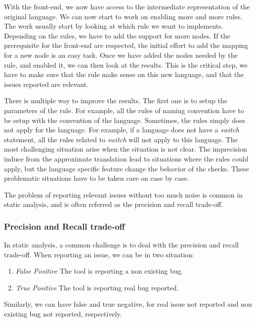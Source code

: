 With the front-end, we now have access to the intermediate representation of the original language. 
We can now start to work on enabling more and more rules. 
The work usually start by looking at which rule we want to implements. 
Depending on the rules, we have to add the support for more nodes. 
If the prerequisite for the front-end are respected, the initial effort to add the mapping for a new node is an easy task. 
Once we have added the nodes needed by the rule, and enabled it, we can then look at the results. 
This is the critical step, we have to make sure that the rule make sense on this new language, and that the issues reported are relevant. 

There is multiple way to improve the results. 
The first one is to setup the parameters of the rule. 
For example, all the rules of naming convention have to be setup with the convention of the language. 
Sometimes, the rules simply does not apply for the language. 
For example, if a language does not have a \emph{switch} statement, all the rules related to \emph{switch} will not apply to this language.
The most challenging situation arise when the situation is not clear. 
The imprecision induce from the approximate translation lead to situations where the rules could apply, but the language specific feature change the behavior of the checks. 
These problematic situations have to be taken care on case by case.

The problem of reporting relevant issues without too much noise is common in static analysis, and is often referred as the precision and recall trade-off.

\subsubsection{Precision and Recall trade-off}
\label{subsubsec:precision_recall}

In static analysis, a common challenge is to deal with the precision and recall trade-off. When reporting an issue, we can be in two situation:

\begin{enumerate}
	\item \textit{False Positive} \newline The tool is reporting a non existing bug.
	\item \textit{True Positive} \newline The tool is reporting real bug reported. 
\end{enumerate}
Similarly, we can have false and true negative, for real issue not reported and non existing bug not reported, respectively. 

